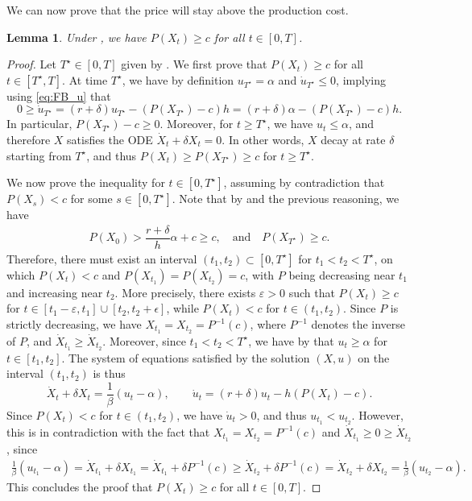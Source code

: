 \documentclass[12pt]{article}
\newtheorem{lemma}{Lemma}[section]
\begin{document}
We can now prove that the price will stay above the production cost. 
\begin{lemma}\label{lem:price_cost}
Under , we have $P(X_t)\geq c$ for all $t \in [0,T]$.
\end{lemma}
\begin{proof}
Let $T^\star \in [0,T]$ given by .
We first prove that $P(X_t)\geq c$ for all $t \in [T^\star,T]$.
At time $T^\star$, we have by definition $u_{T^\star}=\alpha$ and $\dot{u}_{T^\star } \leq 0$, implying using \eqref{eq:FB_u} that
\begin{equation*}
0\geq \dot{u}_{T^\star }
=(r+\delta)u_{T^\star }-(P(X_{T^\star })-c)h
=(r+\delta)\alpha-(P(X_{T^\star })-c)h.
\end{equation*}
In particular, $P(X_{T^\star })-c\geq0$. Moreover, for $t\geq{T^\star }$, we have $u_t \leq \alpha$, and therefore $X$ satisfies the ODE $\dot{X}_t+\delta X_t=0$. In other words, $X$ decay at rate $\delta$ starting from $T^\star$, and thus $P(X_t) \geq P(X_{T^\star }) \geq c$ for $t\geq{T^\star }$.

We now prove the inequality for $t \in [0,T^\star]$, assuming by contradiction that $P(X_s)<c$ for some $s\in[0,T^\star]$. Note that by  and the previous reasoning, we have 
\begin{align*}
    P(X_0)>\dfrac{r+\delta}{h}\alpha + c \geq c, \quad \text{and} \quad P(X_{T^\star }) \geq c.
\end{align*}
Therefore, there must exist an interval $(t_1,t_2) \subset [0,T^\star]$ for $t_1 < t_2 < T^\star$, on which $P(X_t)<c$ and $P(X_{t_1})=P(X_{t_2})=c$, with $P$ being decreasing near $t_1$ and increasing near $t_2$. More precisely, there exists $\varepsilon > 0$ such that $P(X_t)\geq c$ for $t\in [t_1-\varepsilon,t_1] \cup [t_2,t_2+\epsilon]$, while $P(X_t)< c$ for $t\in(t_1,t_2)$. Since $P$ is  strictly
decreasing,
we have $X_{t_1}=X_{t_2}=P^{-1}(c)$, where $P^{-1}$ denotes the inverse of $P$, and $\dot{X}_{t_1}\geq \dot{X}_{t_2}$.
Moreover, since $t_1 < t_2 < T^\star$, we have by  that $u_t\geq\alpha$ for $t\in[t_1,t_2]$. The system of equations satisfied by the solution $(X,u)$ on the interval $(t_1,t_2)$ is thus 
\begin{equation*}
\dot{X}_t+ \delta X_t = \frac{1}{\beta}(u_t-\alpha),\qquad
\dot{u}_t=(r+\delta)u_t-h(P(X_{t})-c).
\end{equation*}
Since $P(X_t)< c$ for $t\in(t_1,t_2)$, we have $\dot{u}_t > 0$, and thus $u_{t_1}<u_{t_2}$. However, this is in contradiction with the fact that $X_{t_1}=X_{t_2}=P^{-1}(c)$ and $\dot{X}_{t_1}\geq0\geq \dot{X}_{t_2}$, since
\begin{align*}
    \frac{1}{\beta}(u_{t_1}-\alpha) = \dot{X}_{t_1}+\delta X_{t_1} = \dot{X}_{t_1}+\delta P^{-1}(c) \geq \dot{X}_{t_2}+\delta P^{-1}(c) = \dot{X}_{t_2}+\delta X_{t_2}=\frac{1}{\beta} (u_{t_2}-\alpha).
\end{align*}
This concludes the proof that $P(X_t)\geq c$ for all $t\in[0,T]$.\end{proof}
\end{document}
